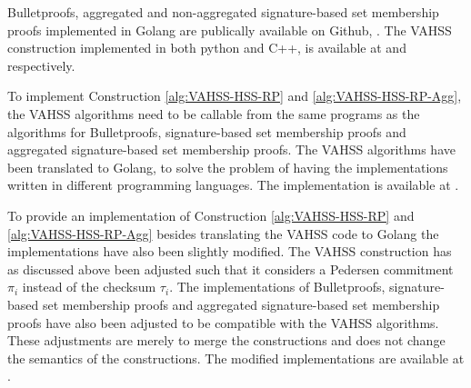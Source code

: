  

Bulletproofs, aggregated and non-aggregated signature-based set membership proofs implemented in Golang are publically available on Github, \cite{Git:RP} \cite{Git:mycode}. The VAHSS construction implemented in both python and C++,  is available at \cite{Git:python_vahss} and \cite{Git:C_vahss} respectively. 

To implement Construction \ref{alg:VAHSS-HSS-RP} and \ref{alg:VAHSS-HSS-RP-Agg},  the VAHSS algorithms need to be callable from the same programs as the algorithms for Bulletproofs, signature-based set membership proofs and aggregated signature-based set membership proofs. The VAHSS algorithms have been translated to Golang, to solve the problem of having the implementations written in different programming languages. The implementation is available at \cite{Git:mycode}.

To provide an implementation of Construction \ref{alg:VAHSS-HSS-RP} and \ref{alg:VAHSS-HSS-RP-Agg} besides translating the VAHSS code to Golang the implementations have also been slightly modified. The VAHSS construction has as discussed above been adjusted such that it considers a Pedersen commitment $\pi_i$ instead of the checksum $\tau_i$. The implementations of Bulletproofs, signature-based set membership proofs and aggregated signature-based set membership proofs have also been adjusted to be compatible with the VAHSS algorithms. These adjustments are merely to merge the constructions and does not change the semantics of the constructions. The modified implementations are available at \cite{Git:mycode}.



